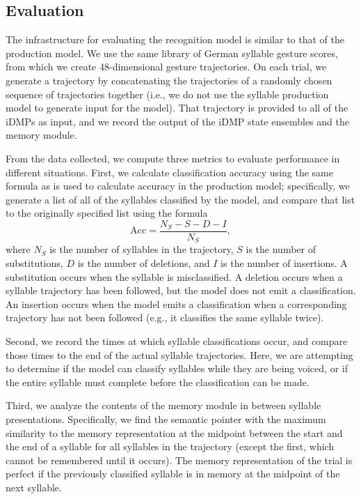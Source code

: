 \subsection{Evaluation}

The infrastructure for evaluating
the recognition model
is similar to that of the production model.
We use the same library
of German syllable gesture scores,
from which we create
48-dimensional gesture trajectories.
On each trial,
we generate a trajectory
by concatenating the trajectories
of a randomly chosen sequence
of trajectories together
(i.e., we do not use the
syllable production model
to generate input for the model).
That trajectory is provided
to all of the iDMPs as input,
and we record the output of the
iDMP state ensembles
and the memory module.

From the data collected,
we compute three metrics
to evaluate performance
in different situations.
First, we calculate
classification accuracy
using the same formula
as is used to calculate
accuracy in the production model;
specifically,
we generate a list of all of the
syllables classified by the model,
and compare that list to the
originally specified list
using the formula
\begin{equation}
  \text{Acc} = \frac{N_S - S - D - I}{N_S},
\end{equation}
where $N_S$ is the number of syllables
in the trajectory,
$S$ is the number of substitutions,
$D$ is the number of deletions,
and $I$ is the number of insertions.
A substitution occurs when
the syllable is misclassified.
A deletion occurs when
a syllable trajectory has been followed,
but the model does not emit a classification.
An insertion occurs
when the model emits a classification
when a corresponding trajectory has not been followed
(e.g., it classifies the same syllable twice).

Second, we record the times at which
syllable classifications occur,
and compare those times
to the end of the actual syllable trajectories.
Here, we are attempting to determine
if the model can classify syllables
while they are being voiced,
or if the entire syllable must complete
before the classification can be made.

Third, we analyze the contents
of the memory module
in between syllable presentations.
Specifically,
we find the semantic pointer
with the maximum similarity
to the memory representation
at the midpoint between
the start and the end of a syllable
for all syllables in the trajectory
(except the first,
which cannot be remembered until it occurs).
The memory representation of the trial
is perfect if the
previously classified syllable
is in memory at the midpoint
of the next syllable.

